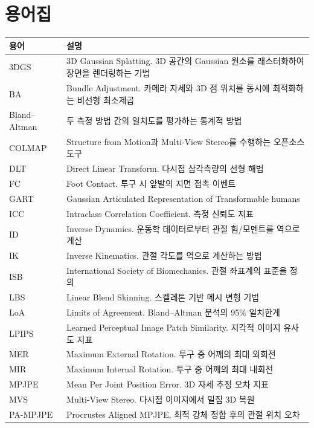 \documentclass[11pt, a4paper]{report}
\begin{document}
\chapter*{용어집}

\begin{longtable}{p{4cm}p{10cm}}
\toprule
\textbf{용어} & \textbf{설명} \\
\midrule
\endhead

3DGS & 3D Gaussian Splatting. 3D 공간의 Gaussian 원소를 래스터화하여 장면을 렌더링하는 기법 \\
BA & Bundle Adjustment. 카메라 자세와 3D 점 위치를 동시에 최적화하는 비선형 최소제곱 \\
Bland--Altman & 두 측정 방법 간의 일치도를 평가하는 통계적 방법 \\
COLMAP & Structure from Motion과 Multi-View Stereo를 수행하는 오픈소스 도구 \\
DLT & Direct Linear Transform. 다시점 삼각측량의 선형 해법 \\
FC & Foot Contact. 투구 시 앞발의 지면 접촉 이벤트 \\
GART & Gaussian Articulated Representation of Transformable humans \\
ICC & Intraclass Correlation Coefficient. 측정 신뢰도 지표 \\
ID & Inverse Dynamics. 운동학 데이터로부터 관절 힘/모멘트를 역으로 계산 \\
IK & Inverse Kinematics. 관절 각도를 역으로 계산하는 방법 \\
ISB & International Society of Biomechanics. 관절 좌표계의 표준을 정의 \\
LBS & Linear Blend Skinning. 스켈레톤 기반 메시 변형 기법 \\
LoA & Limits of Agreement. Bland--Altman 분석의 95\% 일치한계 \\
LPIPS & Learned Perceptual Image Patch Similarity. 지각적 이미지 유사도 지표 \\
MER & Maximum External Rotation. 투구 중 어깨의 최대 외회전 \\
MIR & Maximum Internal Rotation. 투구 중 어깨의 최대 내회전 \\
MPJPE & Mean Per Joint Position Error. 3D 자세 추정 오차 지표 \\
MVS & Multi-View Stereo. 다시점 이미지에서 밀집 3D 복원 \\
PA-MPJPE & Procrustes Aligned MPJPE. 최적 강체 정합 후의 관절 위치 오차 \\

\end{longtable}
\end{document}
